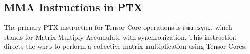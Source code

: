 \subsection{MMA Instructions in PTX}

The primary PTX instruction for Tensor Core operations is \texttt{mma.sync}, which stands for Matrix Multiply Accumulate with synchronization. This instruction directs the warp to perform a collective matrix multiplication using Tensor Cores.

